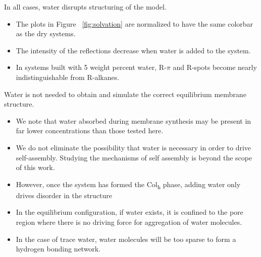 \documentclass{article}
\begin{document}
  In all cases, water disrupts structuring of the model.
  \begin{itemize}
	\item The plots in Figure ~\ref{fig:solvation} are normalized 
	to have the same colorbar as the dry systems. 
	\item The intensity of the reflections decrease when water is 
	added to the system.
	\item In systems built with 5 weight percent water, R-$\pi$ and
	R-spots become nearly indistinguishable from R-alkanes.
  \end{itemize}

  Water is not needed to obtain and simulate the correct equilibrium 
  membrane structure.
  \begin{itemize}
	\item We note that water absorbed during membrane synthesis may
        be present in far lower concentrations than those 
        tested here.
	\item We do not eliminate the possibility that water is necessary
        in order to drive self-assembly. Studying the mechanisms of self assembly is
	beyond the scope of this work.
	\item However, once the system has formed the Col\textsubscript{h} 
	phase, adding water only drives disorder in the structure
	\item In the equilibrium configuration, if water exists, it is confined
	to the pore region where there is no driving force for aggregation of 
	water molecules. 
	\item In the case of trace water, water molecules will be too sparse to
	form a hydrogen bonding network.
  \end{itemize}


 
\end{document}
